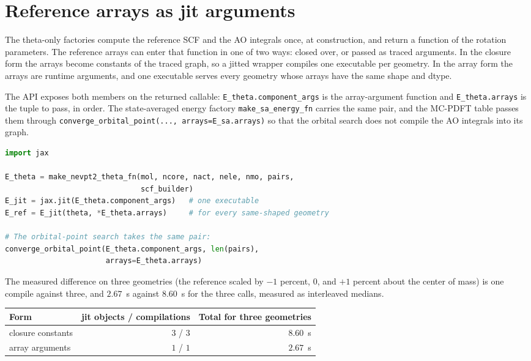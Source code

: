 \section{Reference arrays as jit arguments}

The theta-only factories compute the reference SCF and the AO integrals
once, at construction, and return a function of the rotation
parameters.  The reference arrays can enter that function in one of two
ways: closed over, or passed as traced arguments.  In the closure form
the arrays become constants of the traced graph, so a jitted wrapper
compiles one executable per geometry.  In the array form the arrays are
runtime arguments, and one executable serves every geometry whose
arrays have the same shape and dtype.

The API exposes both members on the returned callable:
\texttt{E\_theta.component\_args} is the array-argument function and
\texttt{E\_theta.arrays} is the tuple to pass, in order.  The
state-averaged energy factory \texttt{make\_sa\_energy\_fn} carries the
same pair, and the MC-PDFT table passes them through
\texttt{converge\_orbital\_point(..., arrays=E\_sa.arrays)} so that the
orbital search does not compile the AO integrals into its graph.

\begin{lstlisting}[language=Python]
import jax

E_theta = make_nevpt2_theta_fn(mol, ncore, nact, nele, nmo, pairs,
                               scf_builder)
E_jit = jax.jit(E_theta.component_args)   # one executable
E_ref = E_jit(theta, *E_theta.arrays)     # for every same-shaped geometry

# The orbital-point search takes the same pair:
converge_orbital_point(E_theta.component_args, len(pairs),
                       arrays=E_theta.arrays)
\end{lstlisting}

The measured difference on three geometries (the reference scaled by
$-1$ percent, $0$, and $+1$ percent about the center of mass) is
one compile against three, and $2.67$~s against $8.60$~s for the three
calls, measured as interleaved medians.

\begin{center}
\begin{tabular}{lrr}
\toprule
Form & jit objects / compilations & Total for three geometries \\
\midrule
closure constants & $3$ / $3$ & $8.60$~s \\
array arguments & $1$ / $1$ & $2.67$~s \\
\bottomrule
\end{tabular}
\end{center}

